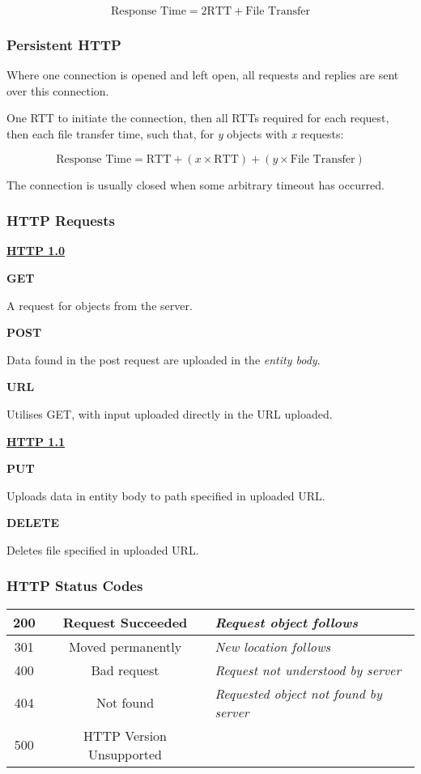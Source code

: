 \documentclass{article}
\begin{document}
\[ \text{Response Time} = 2\text{RTT} + \text{File Transfer} \]

\subsubsection{Persistent HTTP}

Where one connection is opened and left open, all requests and replies are sent over this connection.

One RTT to initiate the connection, then all RTTs required for each request, then each file transfer time, such that, for \textit{y} objects with \textit{x} requests:

\[ \text{Response Time} = \text{RTT} + (x\times\text{RTT}) + (y\times\text{File Transfer})\]

The connection is usually closed when some arbitrary timeout has occurred.

\subsubsection{HTTP Requests}

\underline{\textbf{HTTP 1.0}}

\textbf{GET}

A request for objects from the server.

\textbf{POST}

Data found in the post request are uploaded in the \textit{entity body}.

\textbf{URL}

Utilises GET, with input uploaded directly in the URL uploaded.

\textbf{\underline{HTTP 1.1}}

\textbf{PUT}

Uploads data in entity body to path specified in uploaded URL.

\textbf{DELETE}

Deletes file specified in uploaded URL.

\subsubsection{HTTP Status Codes}

\begin{center}
  \begin{tabular}{|c|c|p{4cm}|}
    \hline
    200 & Request Succeeded & \textit{Request object follows}\\
    \hline
    301 & Moved permanently & \textit{New location follows}\\
    \hline
    400 & Bad request & \textit{Request not understood by server}\\
    \hline
    404 & Not found & \textit{Requested object not found by server}\\
    \hline
    500 & HTTP Version Unsupported & \\
    \hline
  \end{tabular}
\end{center}
\end{document}
